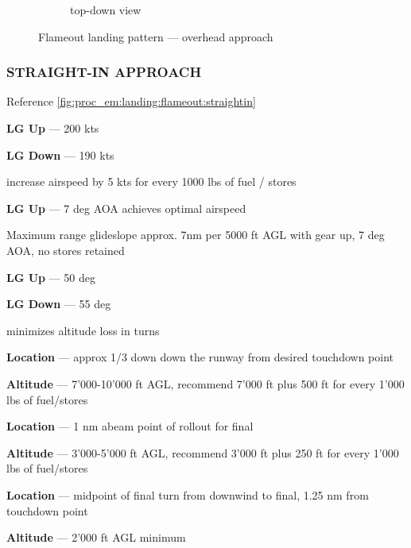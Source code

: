 \begin{figure}[htbp]
\begin{subfigure}[t]{\linewidth}
        \caption{top-down view}
    \end{subfigure}
    \caption{Flameout landing pattern --- overhead approach}
    \label{fig:proc_em:landing:flameout:overhead}
\end{figure}

\clearpage

\subsubsection{STRAIGHT-IN APPROACH}

\begin{tcoloritemize}
    Reference \cref{fig:proc_em:landing:flameout:straightin}

    \textbf{LG Up} --- 200 kts
    
    \medskip
    \textbf{LG Down} --- 190 kts
    
    \bigskip
    increase airspeed by 5 kts for every 1000 lbs of fuel / stores

    \textbf{LG Up} --- 7 deg AOA achieves optimal airspeed

    \blueitem[Glideslope] Maximum range glideslope
    approx. 7nm per 5000 ft AGL with gear up,
    7 deg AOA, no stores retained

    \textbf{LG Up} --- 50 deg

    \medskip
    \textbf{LG Down} --- 55 deg

    \bigskip
    minimizes altitude loss in turns

    \blueitem[Point A]
    \textbf{Location} --- approx {1/3 down down the runway} from desired touchdown point

    \bigskip
    \textbf{Altitude} --- {7'000-10'000 ft AGL},
    recommend 7'000 ft plus 500 ft for every 1'000 lbs of fuel/stores

    \blueitem[Point B]
    \textbf{Location} --- {1 nm abeam} point of rollout for final 

    \bigskip
    \textbf{Altitude} --- {3'000-5'000 ft AGL},
    recommend 3'000 ft plus 250 ft for every 1'000 lbs of fuel/stores

    \blueitem[Area C]
    \textbf{Location} --- midpoint of final turn from downwind to final,
    {1.25 nm from touchdown point}

    \bigskip
    \textbf{Altitude} --- {2'000 ft AGL minimum}
\end{tcoloritemize}


